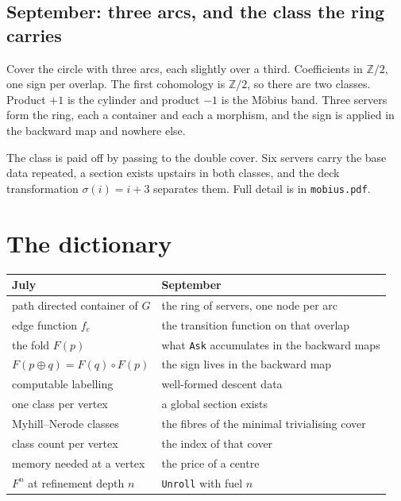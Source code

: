 \documentclass[11pt,a4paper]{article}
\begin{document}
\subsection{September: three arcs, and the class the ring carries}

Cover the circle with three arcs, each slightly over a third. Coefficients in
$\mathbb{Z}/2$, one sign per overlap. The first cohomology is $\mathbb{Z}/2$,
so there are two classes. Product $+1$ is the cylinder and product $-1$ is the
M\"obius band. Three servers form the ring, each a container and each a morphism,
and the sign is applied in the backward map and nowhere else.

The class is paid off by passing to the double cover. Six servers carry the base
data repeated, a section exists upstairs in both classes, and the deck
transformation $\sigma(i) = i+3$ separates them. Full detail is in
\texttt{mobius.pdf}.

\section{The dictionary}

\begin{center}
\begin{tabular}{@{}>{\raggedright\arraybackslash}p{6.3cm}>{\raggedright\arraybackslash}p{7.5cm}@{}}
\toprule
\textbf{July} & \textbf{September} \\
\midrule
path directed container of $G$ & the ring of servers, one node per arc \\
edge function $f_e$ & the transition function on that overlap \\
the fold $F(p)$ & what \verb|Ask| accumulates in the backward maps \\
$F(p \oplus q) = F(q) \circ F(p)$ & the sign lives in the backward map \\
computable labelling & well-formed descent data \\
one class per vertex & a global section exists \\
Myhill--Nerode classes & the fibres of the minimal trivialising cover \\
class count per vertex & the index of that cover \\
memory needed at a vertex & the price of a centre \\
$F^n$ at refinement depth $n$ & \verb|Unroll| with fuel $n$ \\
\bottomrule
\end{tabular}
\end{center}
\end{document}
